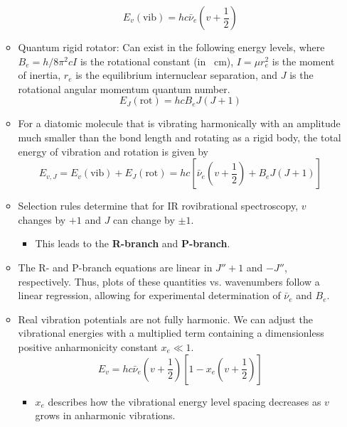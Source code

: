 \documentclass[../notes.tex]{subfiles}
\begin{document}
\begin{itemize}
\begin{itemize}
        \begin{equation*}
            E_v(\text{vib}) = hc\bar{\nu}_e\left( v+\frac{1}{2} \right)
        \end{equation*}
        \item Quantum rigid rotator: Can exist in the following energy levels, where $B_e=h/8\pi^2cI$ is the rotational constant (in \si{\per\centi\meter}), $I=\mu r_e^2$ is the moment of inertia, $r_e$ is the equilibrium internuclear separation, and $J$ is the rotational angular momentum quantum number.
        \begin{equation*}
            E_J(\text{rot}) = hcB_eJ(J+1)
        \end{equation*}
        \item For a diatomic molecule that is vibrating harmonically with an amplitude much smaller than the bond length and rotating as a rigid body, the total energy of vibration and rotation is given by
        \begin{equation*}
            E_{v,J} = E_v(\text{vib})+E_J(\text{rot})
            = hc\left[ \bar{\nu}_e\left( v+\frac{1}{2} \right)+B_eJ(J+1) \right]
        \end{equation*}
        \item Selection rules determine that for IR rovibrational spectroscopy, $v$ changes by $+1$ and $J$ can change by $\pm 1$.
        \begin{itemize}
            \item This leads to the \textbf{R-branch} and \textbf{P-branch}.
        \end{itemize}
        \item The R- and P-branch equations are linear in $J''+1$ and $-J''$, respectively. Thus, plots of these quantities vs. wavenumbers follow a linear regression, allowing for experimental determination of $\bar{\nu}_e$ and $B_e$.
        \item Real vibration potentials are not fully harmonic. We can adjust the vibrational energies with a multiplied term containing a dimensionless positive anharmonicity constant $x_e\ll 1$.
        \begin{equation*}
            E_v = hc\bar{\nu}_e\left( v+\frac{1}{2} \right)\left[ 1-x_e\left( v+\frac{1}{2} \right) \right]
        \end{equation*}
        \begin{itemize}
            \item $x_e$ describes how the vibrational energy level spacing decreases as $v$ grows in anharmonic vibrations.

\end{itemize}
\end{itemize}
\end{itemize}
\end{document}
